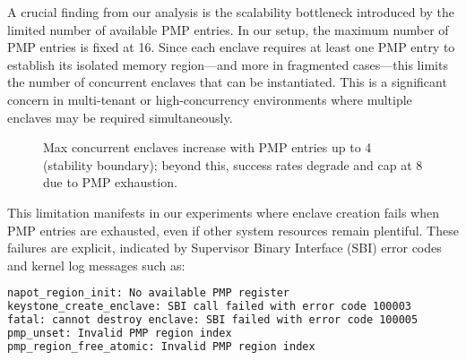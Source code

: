 A crucial finding from our analysis is the scalability bottleneck introduced by the limited number of available PMP entries. In our setup, the maximum number of PMP entries is fixed at 16. Since each enclave requires at least one PMP entry to establish its isolated memory region—and more in fragmented cases—this limits the number of concurrent enclaves that can be instantiated. This is a significant concern in multi-tenant or high-concurrency environments where multiple enclaves may be required simultaneously.

\begin{figure}[htbp]
\centering
{}
\caption{Max concurrent enclaves increase with PMP entries up to 4 (stability boundary); beyond this, success rates degrade and cap at 8 due to PMP exhaustion.}
\end{figure}

This limitation manifests in our experiments where enclave creation fails when PMP entries are exhausted, even if other system resources remain plentiful. These failures are explicit, indicated by Supervisor Binary Interface (SBI) error codes and kernel log messages such as:

\begin{lstlisting}[language=bash,caption={Error messages during enclave creation and destruction}]
napot_region_init: No available PMP register
keystone_create_enclave: SBI call failed with error code 100003
fatal: cannot destroy enclave: SBI failed with error code 100005
pmp_unset: Invalid PMP region index
pmp_region_free_atomic: Invalid PMP region index
\end{lstlisting}

